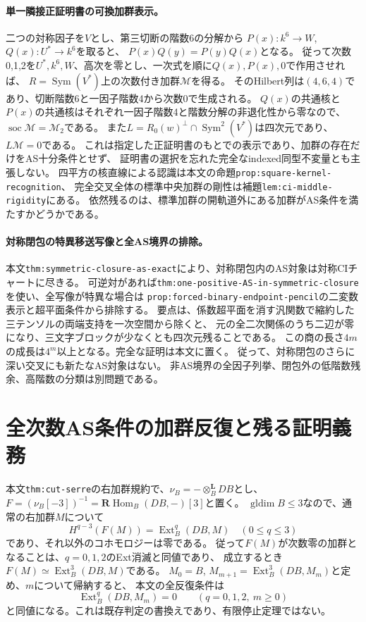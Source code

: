 \documentclass[11pt,a4paper]{ltjsarticle}
\begin{document}
\paragraph{単一隣接正証明書の可換加群表示。}
二つの対称因子を$V$とし、第三切断の階数6の分解から
$P(x):k^6\to W$, $Q(x):U^*\to k^6$を取ると、
$P(x)Q(y)=P(y)Q(x)$となる。
従って次数0,1,2を$U^*,k^6,W$、高次を零とし、一次式を順に$Q(x),P(x),0$で作用させれば、
$R=\operatorname{Sym}(V^*)$上の次数付き加群$\mathcal M$を得る。
そのHilbert列は$(4,6,4)$であり、切断階数6と一因子階数4から次数0で生成される。
$Q(x)$の共通核と$P(x)$の共通核はそれぞれ一因子階数4と階数分解の非退化性から零なので、
$\operatorname{soc}\mathcal M=\mathcal M_2$である。
また$L=R_0(w)^\perp\cap\operatorname{Sym}^2(V^*)$は四次元であり、$L\mathcal M=0$である。
これは指定した正証明書のもとでの表示であり、加群の存在だけをAS十分条件とせず、
証明書の選択を忘れた完全なindexed同型不変量とも主張しない。
四平方の核直線による認識は本文の命題\texttt{prop:square-kernel-recognition}、
完全交叉全体の標準中央加群の剛性は補題\texttt{lem:ci-middle-rigidity}にある。
依然残るのは、標準加群の開軌道外にある加群がAS条件を満たすかどうかである。

\paragraph{対称閉包の特異移送写像と全AS境界の排除。}
本文\texttt{thm:symmetric-closure-as-exact}により、対称閉包内のAS対象は対称CIチャートに尽きる。
可逆対があれば\texttt{thm:one-positive-AS-in-symmetric-closure}を使い、全写像が特異な場合は
\texttt{prop:forced-binary-endpoint-pencil}の二変数表示と超平面条件から排除する。
要点は、係数超平面を消す汎関数で縮約した三テンソルの両端支持を一次空間から除くと、
元の全二次関係のうち二辺が零になり、三文字ブロックが少なくとも四次元残ることである。
この商の長さ$4m$の成長は$4^m$以上となる。完全な証明は本文に置く。
従って、対称閉包のさらに深い交叉にも新たなAS対象はない。
非AS境界の全因子列挙、閉包外の低階数残余、高階数の分類は別問題である。

\section{全次数AS条件の加群反復と残る証明義務}
本文\texttt{thm:cut-serre}の右加群規約で、$\nu_B=-\otimes_B^{\mathbf L}DB$とし、
$F=(\nu_B[-3])^{-1}=\mathbf R\operatorname{Hom}_B(DB,-)[3]$と置く。
$\operatorname{gldim}B\le3$なので、通常の右加群$M$について
\[
 H^{q-3}(F(M))=\operatorname{Ext}_B^q(DB,M)\quad(0\le q\le3)
\]
であり、それ以外のコホモロジーは零である。
従って$F(M)$が次数零の加群となることは、$q=0,1,2$のExt消滅と同値であり、
成立するとき$F(M)\simeq\operatorname{Ext}_B^3(DB,M)$である。
$M_0=B$, $M_{m+1}=\operatorname{Ext}_B^3(DB,M_m)$と定め、$m$について帰納すると、
本文の全反復条件は
\[
 \operatorname{Ext}_B^q(DB,M_m)=0\qquad(q=0,1,2,\ m\ge0)
\]
と同値になる。これは既存判定の書換えであり、有限停止定理ではない。
\end{document}
